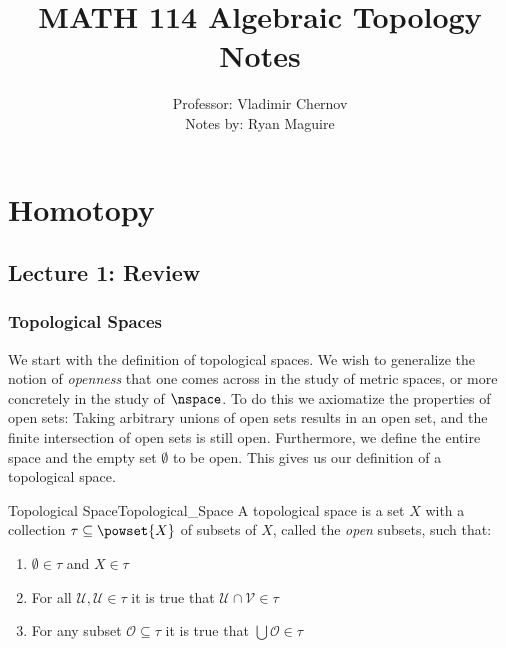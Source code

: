 \documentclass[oneside]{book}                                                  %
\begin{document}
    \title{MATH 114 Algebraic Topology Notes}
    \author{%
        Professor: Vladimir Chernov\\
        Notes by: Ryan Maguire%
    }
    \date{\vspace{-5ex}}
    \maketitle
    \tableofcontents
    \listoffigures
    \chapter{Homotopy}
        \section{Lecture 1: Review}
            \subsection{Topological Spaces}
                We start with the definition of topological spaces. We wish to
                generalize the notion of \textit{openness} that one comes across
                in the study of metric spaces, or more
                concretely in the study of $\nspace$. To do this we axiomatize
                the properties of open sets: Taking arbitrary unions of open
                sets results in an open set, and the finite intersection of open
                sets is still open. Furthermore, we define the entire space and
                the empty set $\emptyset$ to be open. This gives us our
                definition of a topological space.
                \begin{fdefinition}{Topological Space}{Topological_Space}
                    A topological space is a set $X$ with a collection
                    $\tau\subseteq\powset{X}$ of subsets of $X$, called the
                    \textit{open} subsets, such that:
                    \begin{enumerate}
                        \item \label{def:top:Empty_and_X_Open}%
                              $\emptyset\in\tau$ and $X\in\tau$
                        \item \label{def:top:Finite_Intersections}%
                              For all $\mathcal{U},\mathcal{U}\in\tau$ it is
                              true that $\mathcal{U}\cap\mathcal{V}\in\tau$
                        \item \label{def:top:Arbitrary_Unions}%
                              For any subset $\mathcal{O}\subseteq\tau$ it is
                              true that $\bigcup\mathcal{O}\in\tau$
                    \end{enumerate}
                \end{fdefinition}
\end{document}
